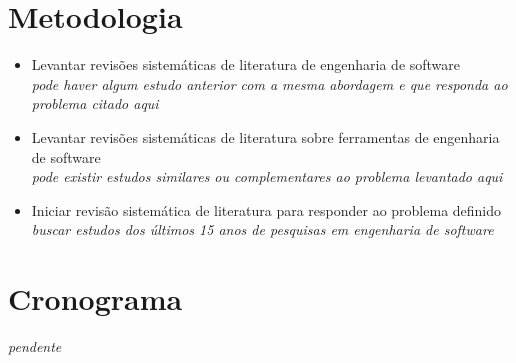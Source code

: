 \documentclass[12pt]{article}
\begin{document}

\section{Metodologia}

\begin{itemize}
\item Levantar revisões sistemáticas de literatura de engenharia de software\\
        {\it pode haver algum estudo anterior com a mesma abordagem e que
        responda ao problema citado aqui}
\item Levantar revisões sistemáticas de literatura sobre ferramentas de
        engenharia de software\\
        {\it pode existir estudos similares ou complementares ao problema
        levantado aqui}
\item Iniciar revisão sistemática de literatura para responder ao problema
        definido\\
        {\it buscar estudos dos últimos 15 anos de pesquisas em engenharia de
        software}
\end{itemize}

\section{Cronograma}

{\it pendente}

% 
\end{document}
